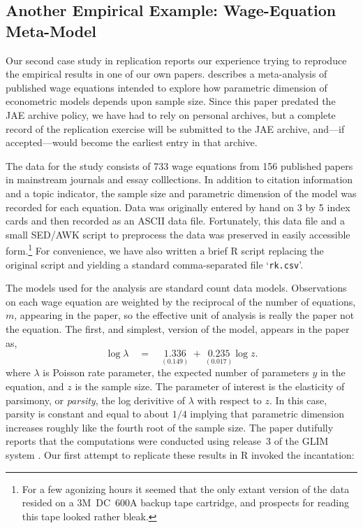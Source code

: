 \documentclass[10pt,a4paper,twoside]{article}
\let\code=\texttt
\let\proglang=\textsf
\newcommand{\file}[1]{`\code{#1}'}
\begin{document}
\subsection{Another Empirical Example: Wage-Equation Meta-Model} \label{sec:wage}


Our second case study in replication reports our experience trying to reproduce
the empirical results in one of our own papers.  \cite{repro:Koenker:1988} describes
a meta-analysis of published wage equations intended to explore how parametric
dimension of econometric models depends upon sample size.  Since this paper
predated the JAE archive policy, we have had to rely on personal archives, but a
complete record of the replication exercise will be submitted to the JAE archive,
and---if accepted---would become the earliest entry in that archive.

The data for the study consists of 733 wage equations from  
156 published papers
in mainstream journals and essay colllections.  In addition to citation information
and a topic indicator, the sample size and parametric dimension of the model was
recorded for each equation.  Data was originally entered by hand on 3 by 5 index cards
and then recorded as an ASCII data file.  Fortunately, this data file and a small
\proglang{SED}/\proglang{AWK} script to preprocess the data was preserved in easily 
accessible form.\footnote{For a few agonizing hours it seemed that the only 
extant version of the data
resided on a 3M~DC~600A backup tape cartridge, and prospects for reading this tape
looked rather bleak.}  For convenience, we have also written a brief \proglang{R}
script replacing the original script and yielding a standard
comma-separated file \file{rk.csv}.
 

The models used for the analysis are standard count data models.  Observations 
on each wage equation are weighted by the reciprocal of the number of equations, $m$,
appearing in the paper, so the effective unit of analysis is really the paper not 
the equation.  The first, and simplest, version of the model, appears in the paper as,
\[
  \log \lambda \quad = \quad  \underset{(0.149)}{1.336} ~+~ \underset {(0.017)}{0.235} \log z.
\]
where $\lambda$ is Poisson rate parameter, the expected number of parameters $y$ in
the equation, and $z$ is the sample size.  The parameter of interest is the
elasticity of parsimony, or \emph{parsity}, the log derivitive of $\lambda$ with respect
to $z$.   In this case, parsity is constant and equal to about $1/4$ implying
that parametric dimension increases roughly like the fourth root of the
sample size.  The paper dutifully reports that the computations were conducted
using release~3 of the \proglang{GLIM} system \citep{repro:Baker+Nelder:1978}.
Our first attempt to replicate these results in \proglang{R} invoked the incantation:
\end{document}

